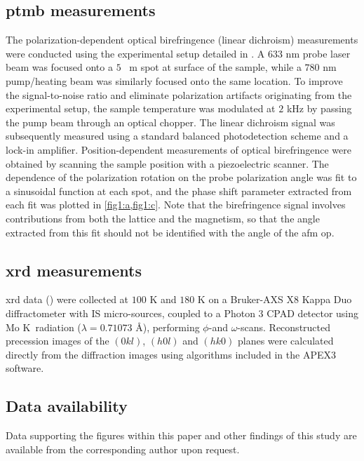 \subsection{\gls{ptmb} measurements}

The polarization-dependent optical birefringence (linear dichroism) measurements were conducted using the experimental setup detailed in \citet{little_three-state_2020}.
A $633$ \si{nm} probe laser beam was focused onto a $5$ \si{\mu m} spot at surface of the sample, while a $780$ \si{nm} pump/heating beam was similarly focused onto the same location.
To improve the signal-to-noise ratio and eliminate polarization artifacts originating from the experimental setup, the sample temperature was modulated at $2$ \si{kHz} by passing the pump beam through an optical chopper.
The linear dichroism signal was subsequently measured using a standard balanced photodetection scheme and a lock-in amplifier.
Position-dependent measurements of optical birefringence were obtained by scanning the sample position with a piezoelectric scanner.
The dependence of the polarization rotation on the probe polarization angle was fit to a sinusoidal function at each spot, and the phase shift parameter extracted from each fit was plotted in \cref{fig1:a,fig1:c}.
Note that the birefringence signal involves contributions from both the lattice and the magnetism, so that the angle extracted from this fit should not be identified with the angle of the \gls{afm} \gls{op}.

\subsection{\gls{xrd} measurements}

\Gls{xrd} data () were collected at $100$ \si{K} and $180$ \si{K} on a Bruker-AXS X8 Kappa Duo diffractometer with I\textmu S micro-sources, coupled to a Photon 3 CPAD detector using \si{Mo} K\textalpha~radiation ($\lambda = 0.71073$ \si{\angstrom}), performing $\phi$-and $\omega$-scans. 
Reconstructed precession images of the $(0kl)$, $(h0l)$ and $(hk0)$ planes were calculated directly from the diffraction images using algorithms included in the APEX3\citep{apex} software.  

\subsection{Data availability}

Data supporting the figures within this paper and other findings of this study are available from the corresponding author upon request.

